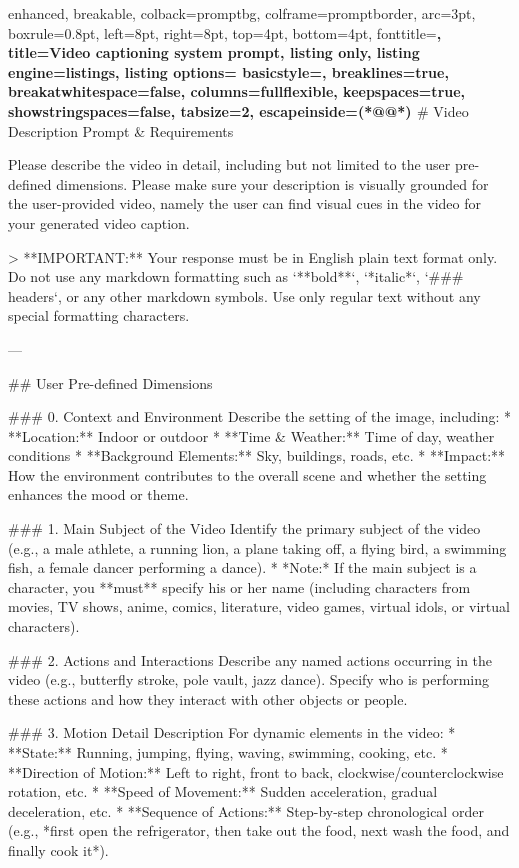 \begin{tcblisting}{
  enhanced,
  breakable,
  colback=promptbg,
  colframe=promptborder,
  arc=3pt,
  boxrule=0.8pt,
  left=8pt,
  right=8pt,
  top=4pt,
  bottom=4pt,
  fonttitle=\bfseries\sffamily,
  title={Video captioning system prompt},
  listing only,
  listing engine=listings,
  listing options={
    basicstyle=\fontsize{6pt}{7pt}\selectfont\ttfamily,
    breaklines=true,
    breakatwhitespace=false,
    columns=fullflexible,
    keepspaces=true,
    showstringspaces=false,
    tabsize=2,
    escapeinside={(*@}{@*)}
  }
}
# Video Description Prompt & Requirements

Please describe the video in detail, including but not limited to the user pre-defined dimensions. Please make sure your description is visually grounded for the user-provided video, namely the user can find visual cues in the video for your generated video caption.

> **IMPORTANT:** Your response must be in English plain text format only. Do not use any markdown formatting such as `**bold**`, `*italic*`, `### headers`, or any other markdown symbols. Use only regular text without any special formatting characters.

---

## User Pre-defined Dimensions

### 0. Context and Environment
Describe the setting of the image, including:
* **Location:** Indoor or outdoor
* **Time & Weather:** Time of day, weather conditions
* **Background Elements:** Sky, buildings, roads, etc.
* **Impact:** How the environment contributes to the overall scene and whether the setting enhances the mood or theme.

### 1. Main Subject of the Video
Identify the primary subject of the video (e.g., a male athlete, a running lion, a plane taking off, a flying bird, a swimming fish, a female dancer performing a dance). 
* *Note:* If the main subject is a character, you **must** specify his or her name (including characters from movies, TV shows, anime, comics, literature, video games, virtual idols, or virtual characters).

### 2. Actions and Interactions
Describe any named actions occurring in the video (e.g., butterfly stroke, pole vault, jazz dance). Specify who is performing these actions and how they interact with other objects or people.

### 3. Motion Detail Description
For dynamic elements in the video:
* **State:** Running, jumping, flying, waving, swimming, cooking, etc.
* **Direction of Motion:** Left to right, front to back, clockwise/counterclockwise rotation, etc.
* **Speed of Movement:** Sudden acceleration, gradual deceleration, etc.
* **Sequence of Actions:** Step-by-step chronological order (e.g., *first open the refrigerator, then take out the food, next wash the food, and finally cook it*).


\end{tcblisting}
